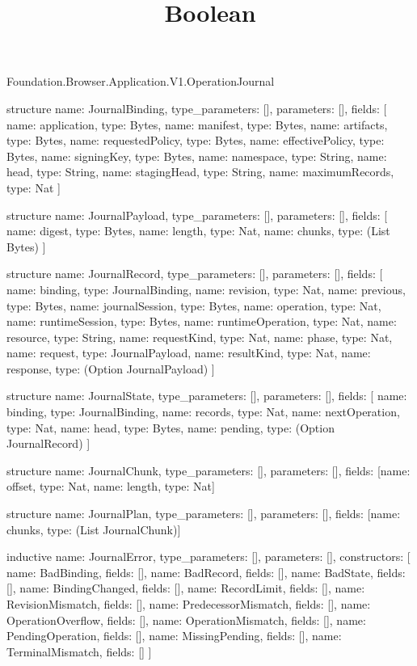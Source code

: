 \begin{lexlean}{Foundation.Browser.Application.V1.OperationJournal}
\title{Boolean}
\begin{semanticmodule}
structure{
  name: JournalBinding,
  type_parameters: [],
  parameters: [],
  fields: [
    {name: application, type: Bytes},
    {name: manifest, type: Bytes},
    {name: artifacts, type: Bytes},
    {name: requestedPolicy, type: Bytes},
    {name: effectivePolicy, type: Bytes},
    {name: signingKey, type: Bytes},
    {name: namespace, type: String},
    {name: head, type: String},
    {name: stagingHead, type: String},
    {name: maximumRecords, type: Nat}
  ]
}

structure{
  name: JournalPayload,
  type_parameters: [],
  parameters: [],
  fields: [
    {name: digest, type: Bytes},
    {name: length, type: Nat},
    {name: chunks, type: (List Bytes)}
  ]
}

structure{
  name: JournalRecord,
  type_parameters: [],
  parameters: [],
  fields: [
    {name: binding, type: JournalBinding},
    {name: revision, type: Nat},
    {name: previous, type: Bytes},
    {name: journalSession, type: Bytes},
    {name: operation, type: Nat},
    {name: runtimeSession, type: Bytes},
    {name: runtimeOperation, type: Nat},
    {name: resource, type: String},
    {name: requestKind, type: Nat},
    {name: phase, type: Nat},
    {name: request, type: JournalPayload},
    {name: resultKind, type: Nat},
    {name: response, type: (Option JournalPayload)}
  ]
}

structure{
  name: JournalState,
  type_parameters: [],
  parameters: [],
  fields: [
    {name: binding, type: JournalBinding},
    {name: records, type: Nat},
    {name: nextOperation, type: Nat},
    {name: head, type: Bytes},
    {name: pending, type: (Option JournalRecord)}
  ]
}

structure{
  name: JournalChunk,
  type_parameters: [],
  parameters: [],
  fields: [{name: offset, type: Nat}, {name: length, type: Nat}]
}

structure{
  name: JournalPlan,
  type_parameters: [],
  parameters: [],
  fields: [{name: chunks, type: (List JournalChunk)}]
}

inductive{
  name: JournalError,
  type_parameters: [],
  parameters: [],
  constructors: [
    {name: BadBinding, fields: []},
    {name: BadRecord, fields: []},
    {name: BadState, fields: []},
    {name: BindingChanged, fields: []},
    {name: RecordLimit, fields: []},
    {name: RevisionMismatch, fields: []},
    {name: PredecessorMismatch, fields: []},
    {name: OperationOverflow, fields: []},
    {name: OperationMismatch, fields: []},
    {name: PendingOperation, fields: []},
    {name: MissingPending, fields: []},
    {name: TerminalMismatch, fields: []}
  ]
}


\end{semanticmodule}
\end{lexlean}

